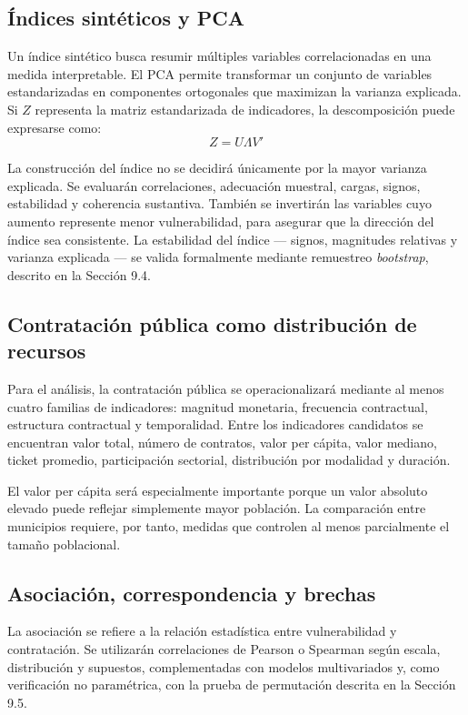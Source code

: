 \documentclass[11pt,letterpaper]{article}
\begin{document}
\subsection{Índices sintéticos y PCA}

Un índice sintético busca resumir múltiples variables correlacionadas en una
medida interpretable. El PCA permite transformar un conjunto de variables
estandarizadas en componentes ortogonales que maximizan la varianza explicada.
Si $Z$ representa la matriz estandarizada de indicadores, la descomposición
puede expresarse como:
\[
Z = U \Lambda V'
\]

La construcción del índice no se decidirá únicamente por la mayor varianza
explicada. Se evaluarán correlaciones, adecuación muestral, cargas, signos,
estabilidad y coherencia sustantiva. También se invertirán las variables cuyo
aumento represente menor vulnerabilidad, para asegurar que la dirección del
índice sea consistente. La estabilidad del índice --- signos, magnitudes
relativas y varianza explicada --- se valida formalmente mediante remuestreo
\textit{bootstrap}, descrito en la Sección 9.4.

\subsection{Contratación pública como distribución de recursos}

Para el análisis, la contratación pública se operacionalizará mediante al
menos cuatro familias de indicadores: magnitud monetaria, frecuencia
contractual, estructura contractual y temporalidad. Entre los indicadores
candidatos se encuentran valor total, número de contratos, valor per cápita,
valor mediano, ticket promedio, participación sectorial, distribución por
modalidad y duración.

El valor per cápita será especialmente importante porque un valor absoluto
elevado puede reflejar simplemente mayor población. La comparación entre
municipios requiere, por tanto, medidas que controlen al menos parcialmente el
tamaño poblacional.

\subsection{Asociación, correspondencia y brechas}

La asociación se refiere a la relación estadística entre vulnerabilidad y
contratación. Se utilizarán correlaciones de Pearson o Spearman según escala,
distribución y supuestos, complementadas con modelos multivariados y, como
verificación no paramétrica, con la prueba de permutación descrita en la
Sección 9.5.
\end{document}
